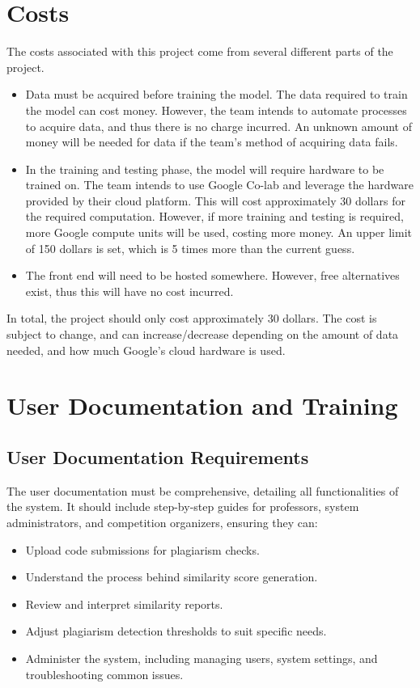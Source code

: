 \documentclass[12pt]{article}
\begin{document}
\section{Costs}
The costs associated with this project come from several different parts of the project.
\begin{itemize}
    \item Data must be acquired before training the model. The data required to
    train the model can cost money. However, the team intends to automate
    processes to acquire data, and thus there is no charge incurred. An unknown
    amount of money will be needed for data if the team's method of acquiring
    data fails.
    \item In the training and testing phase, the model will require hardware to
    be trained on. The team intends to use Google Co-lab and leverage the
    hardware provided by their cloud platform. This will cost approximately 30
    dollars for the required computation. However, if more training and testing
    is required, more Google compute units will be used, costing more money. An
    upper limit of 150 dollars is set, which is 5 times more than the current
    guess. 
    \item The front end will need to be hosted somewhere. However, free
    alternatives exist, thus this will have no cost incurred.

\end{itemize}
In total, the project should only cost approximately 30 dollars. The cost is
subject to change, and can increase/decrease depending on the amount of data
needed, and how much Google's cloud hardware is used.

\section{User Documentation and Training}

\subsection{User Documentation Requirements}
The user documentation must be comprehensive, detailing all functionalities of the system. It should include step-by-step guides for professors, system administrators, and competition organizers, ensuring they can:
\begin{itemize}
    \item Upload code submissions for plagiarism checks.
    \item Understand the process behind similarity score generation.
    \item Review and interpret similarity reports.
    \item Adjust plagiarism detection thresholds to suit specific needs.
    \item Administer the system, including managing users, system settings, and troubleshooting common issues.
\end{itemize}
\end{document}
